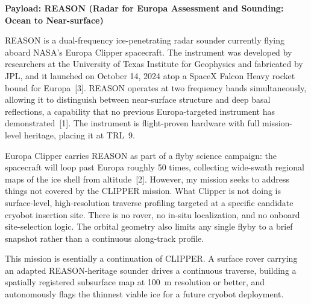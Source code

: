 \documentclass[11pt]{article}
\begin{document}
\noindent\textbf{Payload: REASON (Radar for Europa Assessment and Sounding: Ocean to Near-surface)}

REASON is a dual-frequency ice-penetrating radar sounder currently flying aboard NASA's Europa
Clipper spacecraft. The instrument was developed by researchers at the University of Texas
Institute for Geophysics and fabricated by JPL, and it launched on October 14, 2024 atop a
SpaceX Falcon Heavy rocket bound for Europa~[3]. REASON operates at two frequency bands
simultaneously, allowing it to distinguish between near-surface structure and deep basal
reflections, a capability that no previous Europa-targeted instrument has demonstrated~[1].
The instrument is flight-proven hardware with full mission-level heritage, placing it at TRL~9.

Europa Clipper carries REASON as part of a flyby science campaign: the spacecraft will loop
past Europa roughly 50 times, collecting wide-swath regional maps of the ice shell from
altitude~[2]. However, my mission seeks to address things not covered by the CLIPPER mission. What
Clipper is not doing is surface-level, high-resolution traverse profiling targeted at a specific
candidate cryobot insertion site. There is no rover, no in-situ localization, and no onboard
site-selection logic. The orbital geometry also limits any single flyby to a brief snapshot
rather than a continuous along-track profile.

This mission is esentially a continuation of CLIPPER. A surface rover carrying an adapted
REASON-heritage sounder drives a continuous traverse, building a spatially registered subsurface
map at 100~m resolution or better, and autonomously flags the thinnest viable ice for a future
cryobot deployment.
\end{document}
